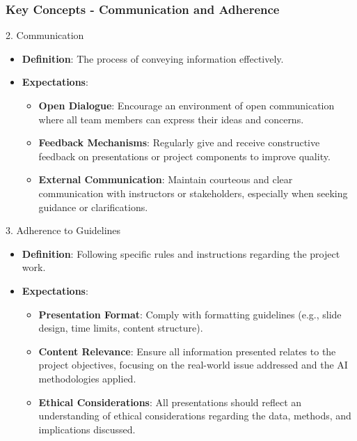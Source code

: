 \documentclass[aspectratio=169]{beamer}
\begin{document}
\begin{frame}[fragile]
    \frametitle{Key Concepts - Communication and Adherence}
    \begin{block}{2. Communication}
        \begin{itemize}
            \item \textbf{Definition}: The process of conveying information effectively.
            \item \textbf{Expectations}:
                \begin{itemize}
                    \item \textbf{Open Dialogue}: Encourage an environment of open communication where all team members can express their ideas and concerns.
                    \item \textbf{Feedback Mechanisms}: Regularly give and receive constructive feedback on presentations or project components to improve quality.
                    \item \textbf{External Communication}: Maintain courteous and clear communication with instructors or stakeholders, especially when seeking guidance or clarifications.
                \end{itemize}
        \end{itemize}
    \end{block}

    \begin{block}{3. Adherence to Guidelines}
        \begin{itemize}
            \item \textbf{Definition}: Following specific rules and instructions regarding the project work.
            \item \textbf{Expectations}:
                \begin{itemize}
                    \item \textbf{Presentation Format}: Comply with formatting guidelines (e.g., slide design, time limits, content structure).
                    \item \textbf{Content Relevance}: Ensure all information presented relates to the project objectives, focusing on the real-world issue addressed and the AI methodologies applied.
                    \item \textbf{Ethical Considerations}: All presentations should reflect an understanding of ethical considerations regarding the data, methods, and implications discussed.
                \end{itemize}
        \end{itemize}
    \end{block}
\end{frame}
\end{document}
